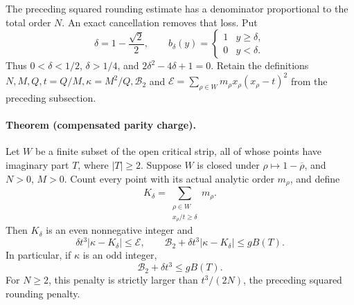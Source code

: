 The preceding squared rounding estimate has a denominator proportional
to the total order \(N\).  An exact cancellation removes that loss.
Put
\[
 \delta=1-\frac{\sqrt2}{2},\qquad
 b_\delta(y)=\begin{cases}1&y\ge\delta,\\0&y<\delta.\end{cases}
\]
Thus \(0<\delta<1/2\), \(\delta>1/4\), and
\(2\delta^2-4\delta+1=0\).  Retain the definitions
\(N,M,Q,t=Q/M,\kappa=M^2/Q,\mathcal B_2\) and
\(\mathcal E=\sum_{\rho\in W}m_\rho x_\rho(x_\rho-t)^2\)
from the preceding subsection.

\paragraph{Theorem (compensated parity charge).}
Let \(W\) be a finite subset of the open critical strip, all of whose
points have imaginary part \(T\), where \(|T|\ge2\).
Suppose \(W\) is closed under \(\rho\mapsto1-\overline\rho\), and
\(N>0\), \(M>0\).  Count every point with its actual analytic order
\(m_\rho\), and define
\[
 K_\delta=\sum_{\substack{\rho\in W\\x_\rho/t\ge\delta}}m_\rho.
\]
Then \(K_\delta\) is an even nonnegative integer and
\begin{equation}
 \delta t^3|\kappa-K_\delta|\le\mathcal E,\qquad
 \mathcal B_2+\delta t^3|\kappa-K_\delta|\le gB(T).
 \label{eq:compensated-moment-charge}
\end{equation}
In particular, if \(\kappa\) is an odd integer,
\begin{equation}
 \mathcal B_2+\delta t^3\le gB(T).
 \label{eq:compensated-moment-odd}
\end{equation}
For \(N\ge2\), this penalty is strictly larger than
\(t^3/(2N)\), the preceding squared rounding penalty.

